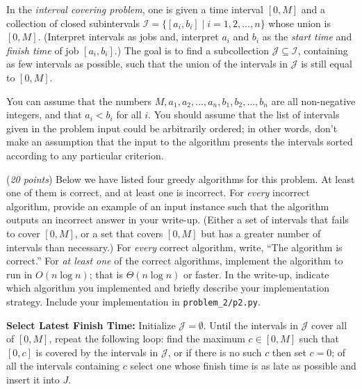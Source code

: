 \documentclass{hw}
\begin{document}
\newpage

\begin{problem}
In the {\em interval covering problem},
one is given a time interval $[0,M]$
and a collection of closed subintervals
$\mathcal{I} = \{[a_i,b_i] \mid i=1,2,\ldots,n\}$
whose union is $[0,M]$. (Interpret intervals as jobs
and, interpret $a_i$ and $b_i$ as the {\em start time}
and {\em finish time} of job $[a_i,b_i]$.)
The goal is to find a subcollection
$\mathcal{J} \subseteq \mathcal{I}$, containing
as few intervals as possible, such that
the union of the intervals in $\mathcal{J}$
is still equal to $[0,M]$.

You can assume that the
numbers $M,a_1,a_2,\ldots,a_n,b_1,b_2,\ldots,b_n$
are all non-negative integers, and that
$a_i < b_i$ for all $i$. You should assume
that the list of intervals given in the
problem input could be arbitrarily ordered;
in other words, don't make an assumption that
the input to the algorithm presents the intervals
sorted according to any particular criterion.

(\textit{20 points}) Below we have listed four greedy algorithms for
this problem. At least one of them is correct,
and at least one is incorrect. For {\em every} incorrect
algorithm, provide an example of an input instance
such that the algorithm outputs an incorrect answer
in your write-up.
(Either a set of intervals that fails to cover $[0,M]$,
or a set that covers $[0,M]$ but has a greater number
of intervals than necessary.) For {\em every} correct
algorithm, write, ``The algorithm is correct.''
For {\em at least one} of the correct algorithms,
implement the algorithm to run in $O(n \log n)$; that is 
$\Theta(n \log n)$ or faster.
In the write-up, indicate which algorithm you implemented
and briefly describe your implementation strategy. Include your implementation in \texttt{problem\_2/p2.py}.

  \begin{subproblem}
    \textbf{Select Latest Finish Time:}
  Initialize $\mathcal{J}=\emptyset$.
  Until the intervals in $\mathcal{J}$ cover all of $[0,M]$,
  repeat the following loop: find the maximum $c \in [0,M]$
  such that $[0,c]$ is covered by the intervals in $\mathcal{J}$,
  or if there is no such $c$ then set $c=0$; of all the intervals
  containing $c$ select one whose finish time is as late as
  possible and insert it into $J$.
  \end{subproblem}


\end{problem}
\end{document}
